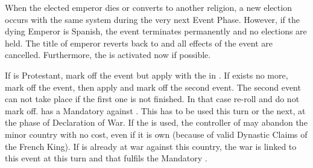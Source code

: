 \effetlong
\aparag When the elected emperor dies or converts to another religion, a new
election occurs with the same system during the very next Event Phase.
\aparag However, if the dying Emperor is Spanish, the event terminates
permanently and no elections are held. The title of emperor reverts back to
\AUSaus and all effects of the event are cancelled. Furthermore, the
 is activated now if possible.





\aparag If \FRA is Protestant, mark off the event but apply \RD with the
\REVOLT in \FRA.
\aparag If \paysNaples exists no more, mark off the event, then apply and mark
off the second event.
\aparag The second event can not take place if the first one is not
finished. In that case re-roll and do not mark off. \phevnt
\aparag \FRA has a Mandatory \CB against \paysNaples. This \CB has to be used
this turn or the next, at the phase of Declaration of War. If the \CB is used,
the controller of \paysNaples may abandon the minor country with no cost, even
if it is own \VASSAL (because of valid Dynastic Claims of the French King).
\aparag If \FRA is already at war against this country, the war is linked to
this event at this turn and that fulfils the Mandatory \CB.


